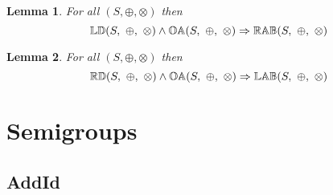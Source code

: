 \documentclass[10pt]{report}
\newcommand{\propname}[1]{{\mathbb{#1}}}
\newtheorem{lemma}{Lemma}
\begin{document}
\begin{lemma} \label{lem:ld_oa_implies_rab}
For all $(S, \oplus, \otimes)$ then
\begin{equation*}
\propname{LD}(S,\ \oplus,\ \otimes) \wedge \propname{OA}(S,\ \oplus,\ \otimes) \Rightarrow \propname{RAB}(S,\ \oplus, \ \otimes)\\
\end{equation*}
\end{lemma}

\begin{lemma} \label{lem:rd_oa_implies_lab}
For all $(S, \oplus, \otimes)$ then
\begin{equation*}
\propname{RD}(S,\ \oplus,\ \otimes) \wedge \propname{OA}(S,\ \oplus,\ \otimes) \Rightarrow \propname{LAB}(S,\ \oplus, \ \otimes)\\
\end{equation*}
\end{lemma}





\section{Semigroups}


\subsection{AddId} 
\end{document}
